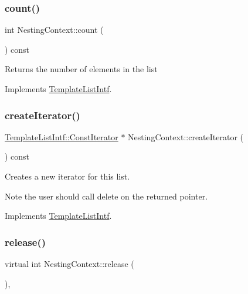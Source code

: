 \subsubsection{\texorpdfstring{count()}{count()}}
{\footnotesize\ttfamily int Nesting\+Context\+::count (\begin{DoxyParamCaption}{ }\end{DoxyParamCaption}) const\hspace{0.3cm}{\ttfamily [virtual]}}

Returns the number of elements in the list 

Implements \mbox{\hyperlink{class_template_list_intf_a329e49e33484c2aa5106aac1bf4e5216}{Template\+List\+Intf}}.

\mbox{\label{class_nesting_context_ab263d1be16f2bfe1e094166a31b4a912}} 
\subsubsection{\texorpdfstring{createIterator()}{createIterator()}}
{\footnotesize\ttfamily \mbox{\hyperlink{class_template_list_intf_1_1_const_iterator}{Template\+List\+Intf\+::\+Const\+Iterator}} $\ast$ Nesting\+Context\+::create\+Iterator (\begin{DoxyParamCaption}{ }\end{DoxyParamCaption}) const\hspace{0.3cm}{\ttfamily [virtual]}}

Creates a new iterator for this list. \begin{DoxyNote}{Note}
the user should call delete on the returned pointer. 
\end{DoxyNote}


Implements \mbox{\hyperlink{class_template_list_intf_a56b82384db24c3e121076a1da046d378}{Template\+List\+Intf}}.

\mbox{\label{class_nesting_context_a4f43acface7c31d6bb2aa3d9a9f2ea13}} 
\subsubsection{\texorpdfstring{release()}{release()}}
{\footnotesize\ttfamily virtual int Nesting\+Context\+::release (\begin{DoxyParamCaption}{ }\end{DoxyParamCaption})\hspace{0.3cm}{\ttfamily [inline]}, {\ttfamily [virtual]}}

